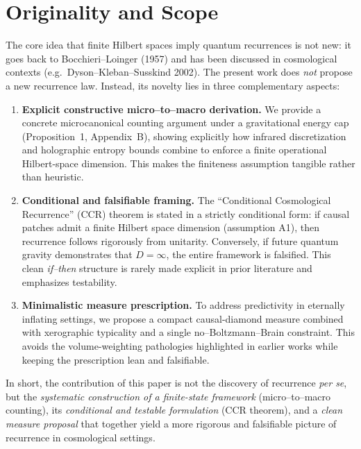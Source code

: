 \documentclass[12pt]{article}
\theoremstyle{remark}
\begin{document}
\section*{Originality and Scope}

The core idea that finite Hilbert spaces imply quantum recurrences is not new: it goes 
back to Bocchieri--Loinger (1957) and has been discussed in cosmological contexts 
(e.g.\ Dyson--Kleban--Susskind 2002). The present work does \emph{not} propose a new 
recurrence law. Instead, its novelty lies in three complementary aspects:

\begin{enumerate}
    \item \textbf{Explicit constructive micro--to--macro derivation.} 
    We provide a concrete microcanonical counting argument under a gravitational 
    energy cap (Proposition~1, Appendix~B), showing explicitly how infrared 
    discretization and holographic entropy bounds combine to enforce a finite 
    operational Hilbert-space dimension. This makes the finiteness assumption tangible 
    rather than heuristic.

    \item \textbf{Conditional and falsifiable framing.} 
    The ``Conditional Cosmological Recurrence'' (CCR) theorem is stated in a strictly 
    conditional form: if causal patches admit a finite Hilbert space dimension 
    (assumption A1), then recurrence follows rigorously from unitarity. Conversely, if 
    future quantum gravity demonstrates that $D=\infty$, the entire framework is 
    falsified. This clean \emph{if--then} structure is rarely made explicit in prior 
    literature and emphasizes testability.

    \item \textbf{Minimalistic measure prescription.} 
    To address predictivity in eternally inflating settings, we propose a compact 
    causal-diamond measure combined with xerographic typicality and a single 
    no--Boltzmann--Brain constraint. This avoids the volume-weighting pathologies 
    highlighted in earlier works while keeping the prescription lean and falsifiable.
\end{enumerate}

In short, the contribution of this paper is not the discovery of recurrence \emph{per se}, 
but the \emph{systematic construction of a finite-state framework} (micro--to--macro 
counting), its \emph{conditional and testable formulation} (CCR theorem), and a 
\emph{clean measure proposal} that together yield a more rigorous and falsifiable picture 
of recurrence in cosmological settings.
\end{document}
